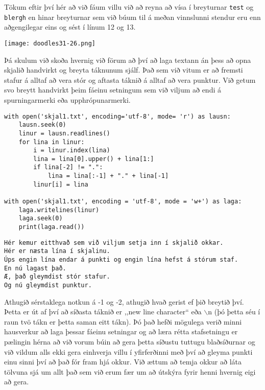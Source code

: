 Tökum eftir því hér að við fáum villu við að reyna að vísa í breyturnar \texttt{test} og \texttt{blergh} en hinar breyturnar sem við búum til á meðan vinnslunni stendur eru enn aðgengilegar eins og sést í línum 12 og 13.
\phantom{easter egg}
\begin{center}
	\texttt{[image: doodles31-26.png]}
\end{center}
Þá skulum við skoða hvernig við förum að því að laga textann án þess að opna skjalið handvirkt og breyta táknunum sjálf.
Það sem við vitum er að fremsti stafur á alltaf að vera stór og aftasta táknið á alltaf að vera punktur.
Við getum svo breytt handvirkt þeim fáeinu setningum sem við viljum að endi á spurningarmerki eða upphrópunarmerki.

\begin{lstlisting}[caption=Leysum punkta- og hástafavandann okkar, label=lst:skjalavinnsla-lausn]
with open('skjal1.txt', encoding='utf-8', mode= 'r') as lausn:
	lausn.seek(0)
	linur = lausn.readlines()
	for lina in linur:
		i = linur.index(lina)
		lina = lina[0].upper() + lina[1:]
		if lina[-2] != ".":
			lina = lina[:-1] + "." + lina[-1]
		linur[i] = lina

with open('skjal1.txt', encoding = 'utf-8', mode = 'w+') as laga:
	laga.writelines(linur)
	laga.seek(0)
	print(laga.read())
\end{lstlisting}
\lstset{style=uttak}
\begin{lstlisting}
Hér kemur eitthvað sem við viljum setja inn í skjalið okkar.
Hér er næsta lína í skjalinu.
Úps engin lína endar á punkti og engin lína hefst á stórum staf.
En nú lagast það.
Æ, það gleymdist stór stafur.
Og nú gleymdist punktur.
\end{lstlisting}
\lstset{style=venjulegt}

Athugið sérstaklega notkun á -1 og -2, athugið hvað gerist ef þið breytið því.
Þetta er út af því að síðasta táknið er ,,new line character“ eða $\backslash$n (þó þetta séu í raun tvö tákn er þetta saman eitt tákn).
Þó það hefði mögulega verið minni hausverkur að laga þessar fáeinu setningar og að læra rétta stafsetningu er pælingin hérna að við vorum búin að gera þetta síðustu tuttugu blaðsíðurnar og við vildum alls ekki gera einhverja villu í yfirferðinni með því að gleyma punkti einu sinni því að það fór fram hjá okkur.
Við ættum að temja okkur að láta tölvuna sjá um allt það sem við erum fær um að útskýra fyrir henni hvernig eigi að gera.

